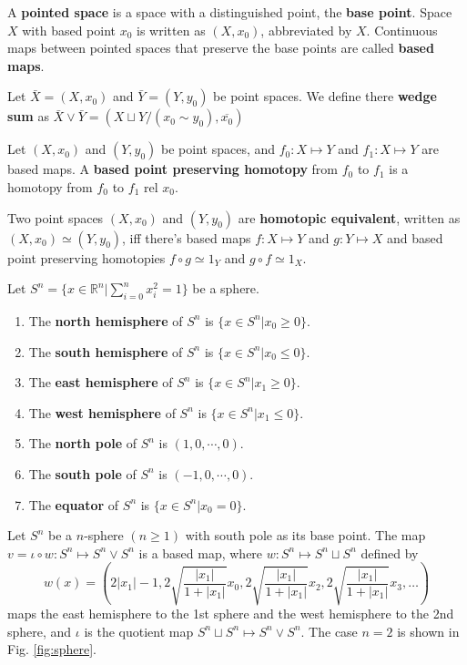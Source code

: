 \documentclass[12pt]{book}
\begin{document}
\begin{definition}
	A {\bf pointed space} is a space with a distinguished point, the {\bf base point}. Space $X$ with based point $x_0$ is written as $(X,x_0)$, abbreviated by $X$. Continuous maps between pointed spaces that preserve the base points are called {\bf based maps}.
\end{definition}

\begin{definition}
	Let $\bar X=(X,x_0)$ and $\bar Y=(Y,y_0)$ be point spaces. We define there {\bf wedge sum} as $\bar X\vee \bar Y=(X\sqcup Y/(x_0\sim y_0),\overline{x_0})$
\end{definition}

\begin{definition}
	Let $(X,x_0)$ and $(Y,y_0)$ be point spaces, and $f_0:X\mapsto Y$ and $f_1:X\mapsto Y$ are based maps. A {\bf based point preserving homotopy} from $f_0$ to $f_1$ is a homotopy from $f_0$ to $f_1$ rel $x_0$.
\end{definition}

\begin{definition}
	Two point spaces $(X,x_0)$ and $(Y,y_0)$ are {\bf homotopic equivalent}, written as $(X,x_0)\simeq(Y,y_0)$, iff there's based maps $f:X\mapsto Y$ and $g:Y\mapsto X$ and based point preserving homotopies $f\circ g\simeq 1_Y$ and $g\circ f\simeq 1_X$.
\end{definition}

\begin{definition}
	Let $S^n=\{x\in\mathbb R^n|\sum_{i=0}^n x_i^2=1\}$ be a sphere.
	\begin{enumerate}
		\item The {\bf north hemisphere} of $S^n$ is $\{x\in S^n|x_0\geq0\}$.
		\item The {\bf south hemisphere} of $S^n$ is $\{x\in S^n|x_0\leq0\}$.
		\item The {\bf east hemisphere} of $S^n$ is $\{x\in S^n|x_1\geq0\}$.
		\item The {\bf west hemisphere} of $S^n$ is $\{x\in S^n|x_1\leq0\}$.
		\item The {\bf north pole} of $S^n$ is $(1,0,\cdots,0)$.
		\item The {\bf south pole} of $S^n$ is $(-1,0,\cdots,0)$.
		\item The {\bf equator} of $S^n$ is $\{x\in S^n|x_0=0\}$.
	\end{enumerate}
\end{definition}

\begin{lemma}
	Let $S^n$ be a $n$-sphere $(n\geq1)$ with south pole as its base point. The map $v=\iota\circ w:S^n\mapsto S^n\vee S^n$ is a based map, where $w:S^n\mapsto S^n\sqcup S^n$ defined by
	\begin{equation}
		w(x)=(2|x_1|-1,2\sqrt{\frac{|x_1|}{1+|x_1|}}x_0,2\sqrt{\frac{|x_1|}{1+|x_1|}}x_2,2\sqrt{\frac{|x_1|}{1+|x_1|}}x_3,\dots)
	\end{equation}
	maps the east hemisphere to the 1st sphere and the west hemisphere to the 2nd sphere, and $\iota$ is the quotient map $S^n\sqcup S^n\mapsto S^n\vee S^n$. The case $n=2$ is shown in Fig. \ref{fig:sphere}.
\end{lemma}
\end{document}
